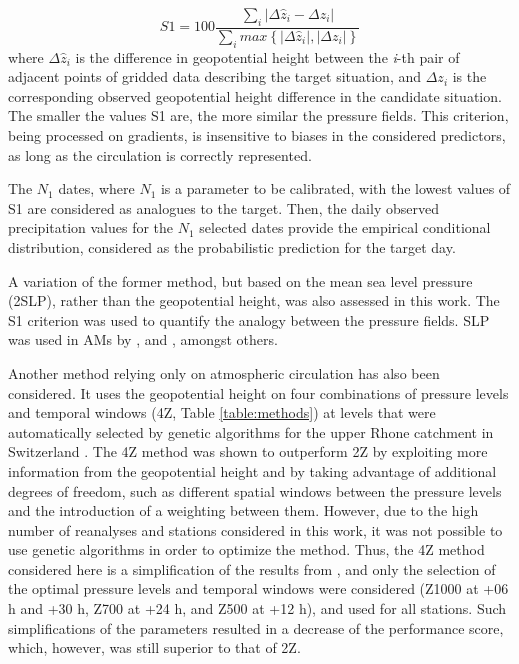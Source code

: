 \documentclass{ametsoc}
\begin{document}
	\begin{equation}
	\label{eq:S1}
	S1=100 \frac {\displaystyle \sum_{i} \vert \Delta\hat{z}_{i} - \Delta z_{i} \vert}
	{\displaystyle \sum_{i} max\left\lbrace \vert \Delta\hat{z}_{i} \vert , \vert \Delta z_{i} \vert \right\rbrace }
	\end{equation}
	where $\Delta \hat{z}_{i}$ is the difference in geopotential height between the \textit{i}-th pair of adjacent points of gridded data describing the target situation, and $\Delta z_{i}$ is the corresponding observed geopotential height difference in the candidate situation. The smaller the values S1 are, the more similar the pressure fields. This criterion, being processed on gradients, is insensitive to biases in the considered predictors, as long as the circulation is correctly represented.
	
	The $N_{1}$ dates, where $N_{1}$ is a parameter to be calibrated, with the lowest values of S1 are considered as analogues to the target. Then, the daily observed precipitation values for the $N_{1}$ selected dates provide the empirical conditional distribution, considered as the probabilistic prediction for the target day.
	
	A variation of the former method, but based on the mean sea level pressure (2SLP), rather than the geopotential height, was also assessed in this work. The S1 criterion was used to quantify the analogy between the pressure fields. SLP was used in AMs by \citet{Zorita1999}, \citet{Timbal2001a} and \citet{Martin2014b}, amongst others.
	
	Another method relying only on atmospheric circulation has also been considered. It uses the geopotential height on four combinations of pressure levels and temporal windows (4Z, Table \ref{table:methods}) at levels that were automatically selected by genetic algorithms for the upper Rhone catchment in Switzerland \citep{Horton2017b}. The 4Z method was shown to outperform 2Z by exploiting more information from the geopotential height and by taking advantage of additional degrees of freedom, such as different spatial windows between the pressure levels and the introduction of a weighting between them. However, due to the high number of reanalyses and stations considered in this work, it was not possible to use genetic algorithms in order to optimize the method. Thus, the 4Z method considered here is a simplification of the results from \citet{Horton2017b}, and only the selection of the optimal pressure levels and temporal windows were considered (Z1000 at +06 h and +30 h, Z700 at +24 h, and Z500 at +12 h), and used for all stations. Such simplifications of the parameters resulted in a decrease of the performance score, which, however, was still superior to that of 2Z.
	
\end{document}
